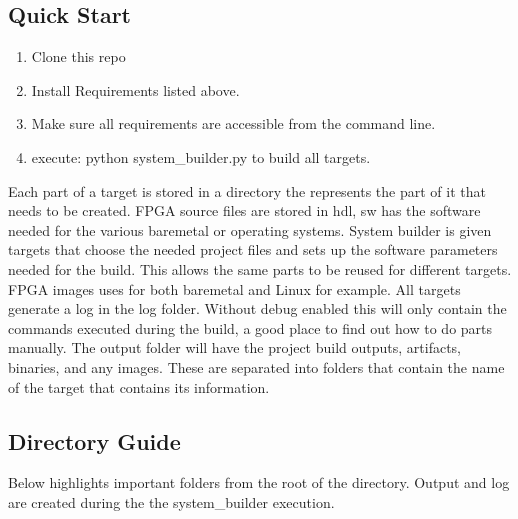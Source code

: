 \subsection{Quick Start}
\begin{enumerate}
\item Clone this repo
\item Install Requirements listed above.
\item Make sure all requirements are accessible from the command line.
\item execute: python system\_builder.py to build all targets.
\end{enumerate}

\par
Each part of a target is stored in a directory the represents the part of it that needs to be created. FPGA source files are stored in hdl, sw has the software needed
for the various baremetal or operating systems. System builder is given targets that choose the needed project files and sets up the software parameters needed for the build.
This allows the same parts to be reused for different targets. FPGA images uses for both baremetal and Linux for example. All targets generate a log in the log folder.
Without debug enabled this will only contain the commands executed during the build, a good place to find out how to do parts manually. The output folder will have
the project build outputs, artifacts, binaries, and any images. These are separated into folders that contain the name of the target that contains its information.

\subsection{Directory Guide}

\par
Below highlights important folders from the root of the directory. Output and log are created during the the system\_builder execution.

